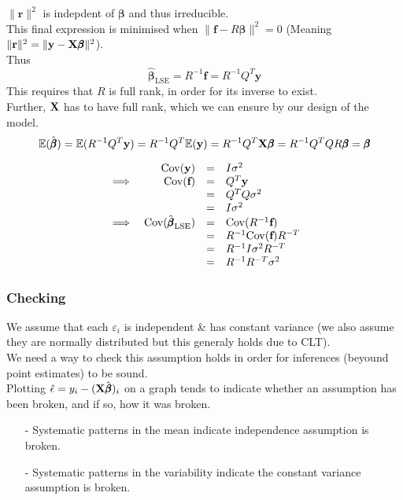 \documentclass[11pt,a4paper]{article}
\begin{document}
$\|\textbf{r}\|^2$ is indepdent of $\pmb\beta$ and thus irreducible.\\
This final expression is minimised when $\|\textbf{f}-R\pmb\beta\|^2=0$ (Meaning $\|\textbf{r}\|^2=\|\textbf{y}-\textbf{X}\pmb\beta\|^2$).\\
Thus
$$\hat{\pmb\beta}_\text{LSE}=R^{-1}\textbf{f}=R^{-1}Q^T\textbf{y}$$
This requires that $R$ is full rank, in order for its inverse to exist.\\
Further, $\textbf{X}$ has to have full rank, which we can ensure by our design of the model.\\

$$\mathbb{E}(\hat{\pmb\beta})=\mathbb{E}(R^{-1}Q^T\textbf{y})=R^{-1}Q^T\mathbb{E}(\textbf{y})=R^{-1}Q^T\textbf{X}\pmb\beta=R^{-1}Q^TQR\pmb\beta=\pmb\beta$$

\[\begin{array}{rrcl}
&\mathrm{Cov}(\textbf{y})&=&I\sigma^2\\
\implies&\mathrm{Cov}(\textbf{f})&=&Q^T\textbf{y}\\
&&=&Q^TQ\sigma^2\\
&&=&I\sigma^2\\
\implies&\mathrm{Cov}(\hat{\pmb\beta}_\text{LSE})&=&\mathrm{Cov}(R^{-1}\textbf{f})\\
&&=&R^{-1}\mathrm{Cov}(\textbf{f})R^{-T}\\
&&=&R^{-1}I\sigma^2R^{-T}\\
&&=&R^{-1}R^{-T}\sigma^2
\end{array}\]

\subsubsection{Checking}

We assume that each $\varepsilon_i$ is independent \& has constant variance (we also assume they are normally distributed but this generaly holds due to CLT).\\
We need a way to check this assumption holds in order for inferences (beyound point estimates) to be sound.\\

Plotting $\hat\epsilon=y_i-(\textbf{X}\hat{\pmb\beta})_i$ on a graph tends to indicate whether an assumption has been broken, and if so, how it was broken.
\begin{itemize}
	\item[-] Systematic patterns in the mean indicate independence assumption is broken.
	\item[-] Systematic patterns in the variability indicate the constant variance assumption is broken.
\end{itemize}
\end{document}
